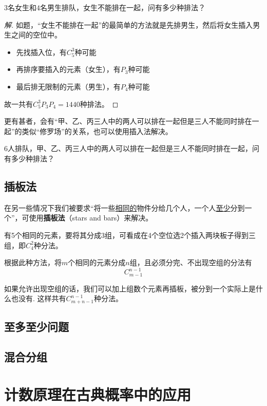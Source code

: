 \begin{example}
	$3$名女生和$4$名男生排队，女生不能排在一起，问有多少种排法？
\end{example}

\begin{proof}[解]
	如题，“女生不能排在一起”的最简单的方法就是先排男生，然后将女生插入男生之间的空位中。

	\begin{itemize}
		\item 先找插入位，有$C_5^3$种可能
		\item 再排序要插入的元素（女生），有$P_3$种可能
		\item 最后排无限制的元素（男生），有$P_4$种可能
	\end{itemize}

	故一共有$C_5^3P_3P_4=1440$种排法。
\end{proof}

更有甚者，会有“甲、乙、丙三人中的两人可以排在一起但是三人不能同时排在一起”的类似“修罗场”的关系，也可以使用插入法解决。

\begin{example}
	$6$人排队，甲、乙、丙三人中的两人可以排在一起但是三人不能同时排在一起，问有多少种排法？
\end{example}

\subsection{插板法}
在另一些情况下我们被要求“将一些\uline{相同的}物件分给几个人，一个人\uline{至少}分到一个”，可使用\textbf{插板法}（stars and bars）来解决。

有5个相同的元素，要将其分成3组，可看成在4个空位选2个插入两块板子得到三组，即$C_4^2$种分法。

根据此种方法，将$m$个相同的元素分成$n$组，且必须分完、不出现空组的分法有\[C_{m-1}^{n-1}\]

如果允许出现空组的话，我们可以加上组数个元素再插板，被分到一个实际上是什么也没有. 这样共有$C_{m+n-1}^{n-1}$种分法。

\subsection{至多至少问题}

\subsection{混合分组}

\section[概率]{计数原理在古典概率中的应用}
